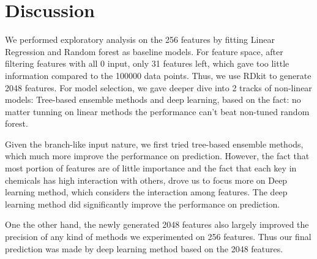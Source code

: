 \documentclass[11pt]{article}
\begin{document}


\section{Discussion} 
We performed exploratory analysis on the 256 features by fitting Linear Regression and Random forest as baseline models. For feature space, after filtering features with all 0 input, only 31 features left, which gave too little information compared to the 100000 data points. Thus, we use RDkit to generate 2048 features.  For model selection, we gave deeper dive into 2 tracks of non-linear models: Tree-based ensemble methods and deep learning, based on the fact: no matter tunning on linear methods the performance can't beat non-tuned random forest.

Given the branch-like input nature, we first tried tree-based ensemble methods, which much more improve the performance on prediction. However, the fact that most portion of features are of little importance and the fact that each key in chemicals has high interaction with others, drove us to focus more on Deep learning method, which considers the interaction among features. The deep learning method did significantly improve the performance on prediction.

One the other hand, the newly generated 2048 features also largely improved the precision of any kind of methods we experimented on 256 features. Thus our final prediction was made by deep learning method based on the 2048 features.
\end{document}
